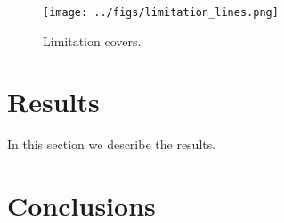 \documentclass[12pt]{article}
\begin{document}
\begin{figure}[!ht]
  \centering
    \texttt{[image: ../figs/limitation\_lines.png]}
   
  \caption{Limitation covers.}
\end{figure}

\section{Results}\label{results}
In this section we describe the results.

\section{Conclusions}\label{conclusions}




\end{document}
